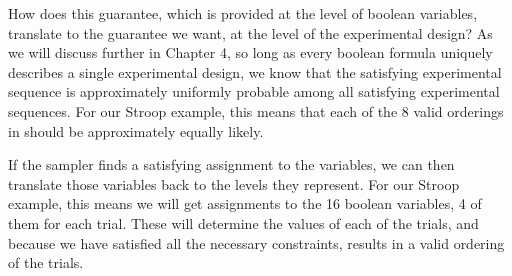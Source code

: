 How does this guarantee, which is provided at the level of boolean variables, translate to the guarantee we want, at the level of the experimental design? As we will discuss further in Chapter 4, so long as every boolean formula uniquely describes a single experimental design, we know that the satisfying experimental sequence is approximately uniformly probable among all satisfying experimental sequences. For our Stroop example, this means that each of the 8 valid orderings in  should be approximately equally likely.

If the sampler finds a satisfying assignment to the variables, we can then translate those variables back to the levels they represent. For our Stroop example, this means we will get assignments to the 16 boolean variables, 4 of them for each trial. These will determine the values of each of the trials, and because we have satisfied all the necessary constraints, results in a valid ordering of the trials.
